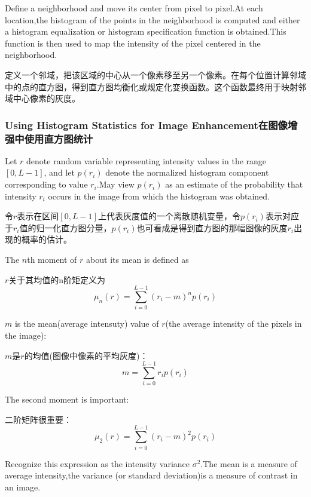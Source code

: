 \documentclass[a4paper,12pt]{article}
\numberwithin{equation}{section}%
\begin{document}
Define a neighborhood and move its center from pixel to pixel.At each location,the histogram of the points in the neighborhood is computed and either a histogram equalization or histogram specification function is obtained.This function is then used to map the intensity of the pixel centered in the neighborhood.

定义一个邻域，把该区域的中心从一个像素移至另一个像素。在每个位置计算邻域中的点的直方图，得到直方图均衡化或规定化变换函数。这个函数最终用于映射邻域中心像素的灰度。
\subsubsection{Using Histogram Statistics for Image Enhancement在图像增强中使用直方图统计}

Let $r$ denote random variable representing intensity values in the range $[0,L-1]$, and let $p(r_{i})$ denote the normalized histogram component corresponding to value $r_{i}$.May view  $p(r_{i})$ as an estimate of the probability that intensity $r_{i}$ occurs in the image from which the histogram was obtained.

令$r$表示在区间$[0,L-1]$上代表灰度值的一个离散随机变量，令$p(r_{i})$表示对应于$r_{i}$值的归一化直方图分量，$p(r_{i})$也可看成是得到直方图的那幅图像的灰度$r_{i}$出现的概率的估计。

The $n$th moment of $r$ about its mean is defined as 

$r$关于其均值的n阶矩定义为
\begin{equation} \label {3.17}
\mu_{n}(r)=\sum_{i=0}^{L-1}(r_{i}-m)^{n}p(r_{i})
\end{equation}

$m$ is the mean(average intensuty) value of $r$(the average intensity of the pixels in the image):

$m$是$r$的均值(图像中像素的平均灰度)：
\begin{equation} \label {3.18}
m=\sum_{i=0}^{L-1}r_{i}p(r_{i})
\end{equation}

The second moment is important:

二阶矩阵很重要：
\begin{equation} \label {3.19}
\mu_{2}(r)=\sum_{i=0}^{L-1}(r_{i}-m)^{2}p(r_{i})
\end{equation}

Recognize this expression as the intensity variance $\sigma^{2}$.The mean is a measure of average intensity,the variance (or standard deviation)is a measure of contrast in an image.
\end{document}
